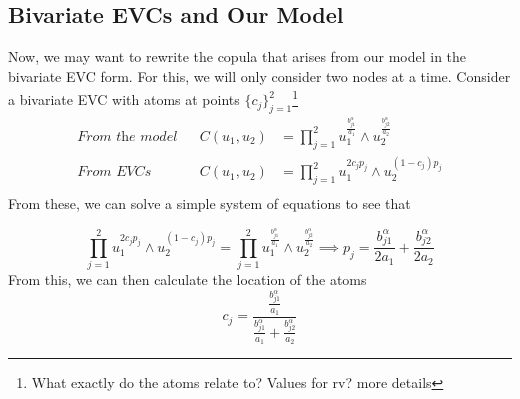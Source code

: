 \documentclass[12pt]{article}
\newcommand{\ds}{\displaystyle}
\theoremstyle{definition}
\theoremstyle{definition}
\begin{document}
\subsection{Bivariate EVCs and Our Model}
Now, we may want to rewrite the copula that arises from our model in the bivariate EVC form. For this, we will only consider two nodes at a time. Consider a bivariate EVC with atoms at points $\ds\{c_j\}_{j=1}^2$\footnote{What exactly do the atoms relate to? Values for rv? more details }
\begin{align*}
    \textit{From the model}&& C(u_1,u_2)&=\prod_{j=1}^2u_1^{\frac{b_{j1}^\alpha}{a_1}}\wedge u_2^{\frac{b_{j2}^\alpha}{a_2}}\\
    \textit{From EVCs}&&C(u_1,u_2)&= \prod_{j=1}^2 u_1^{2c_jp_j}\wedge u_2^{(1-c_j)p_j} \\
\end{align*}
From these, we can solve a simple system of equations to see that 

$$\prod_{j=1}^2 u_1^{2c_jp_j}\wedge u_2^{(1-c_j)p_j}=\prod_{j=1}^2u_1^{\frac{b_{j1}^\alpha}{a_1}}\wedge u_2^{\frac{b_{j2}^\alpha}{a_2}}\implies p_j=\frac{b_{j1}^\alpha}{2a_1}+\frac{b_{j2}^\alpha}{2a_2}$$
From this, we can then calculate the location of the atoms 
$$\ds c_j=\frac{\frac{b_{j1}^\alpha}{a_1}}{\frac{b_{j1}^\alpha}{a_1}+\frac{b_{j2}^\alpha}{a_2}}$$
 
 
 
\end{document}
